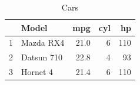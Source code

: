 \begin{table}[ht]
\centering
\begin{tabular}{rlrrr}
  \hline
 & Model & mpg & cyl & hp \\ 
  \hline
1 & Mazda RX4 & 21.0 & 6 & 110 \\ 
  2 & Datsun 710 & 22.8 & 4 & 93 \\ 
  3 & Hornet 4 & 21.4 & 6 & 110 \\ 
   \hline
\end{tabular}
\caption{Cars} 
\label{tab:cars}
\end{table}

